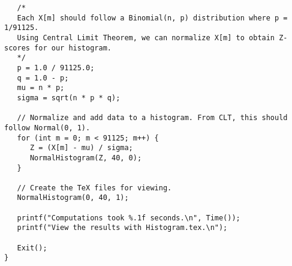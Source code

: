 \documentclass{article}
\begin{document}
\begin{lstlisting}
   /*
   Each X[m] should follow a Binomial(n, p) distribution where p = 1/91125.
   Using Central Limit Theorem, we can normalize X[m] to obtain Z-scores for our histogram.
   */ 
   p = 1.0 / 91125.0;
   q = 1.0 - p;
   mu = n * p;
   sigma = sqrt(n * p * q);

   // Normalize and add data to a histogram. From CLT, this should follow Normal(0, 1).
   for (int m = 0; m < 91125; m++) {
      Z = (X[m] - mu) / sigma;
      NormalHistogram(Z, 40, 0);
   }

   // Create the TeX files for viewing.
   NormalHistogram(0, 40, 1);

   printf("Computations took %.1f seconds.\n", Time());
   printf("View the results with Histogram.tex.\n");

   Exit();
}
\end{lstlisting}
\end{document}
